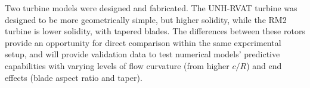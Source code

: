 Two turbine models were designed and fabricated. The UNH-RVAT turbine was
designed to be more geometrically simple, but higher solidity, while the RM2
turbine is lower solidity, with tapered blades. The differences between these
rotors provide an opportunity for direct comparison within the same experimental
setup, and will provide validation data to test numerical models' predictive
capabilities with varying levels of flow curvature (from higher $c/R$) and end
effects (blade aspect ratio and taper).
